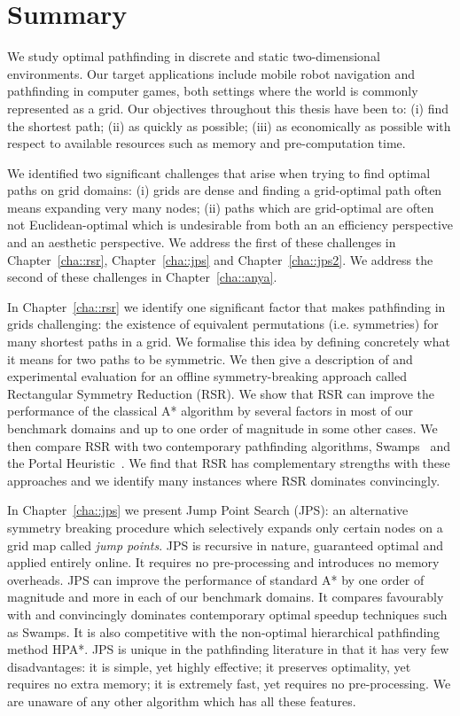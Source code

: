 \section{Summary}
\label{cha::conclusion::summary}
We study optimal pathfinding in discrete and static two-dimensional
environments. Our target applications include mobile robot navigation and
pathfinding in computer games, both settings where the world is commonly
represented as a grid. Our objectives throughout this thesis have been to: (i)
find the shortest path; (ii) as quickly as possible; (iii) as economically as
possible with respect to available resources such as memory and
pre-computation time.

We identified two significant challenges that arise when trying to find optimal
paths on grid domains: (i) grids are dense and finding a grid-optimal path often
means expanding very many nodes; (ii) paths which are grid-optimal are often
not Euclidean-optimal which is undesirable from both an an efficiency
perspective and an aesthetic perspective. We address the first of these
challenges in Chapter~\ref{cha::rsr}, Chapter~\ref{cha::jps} and
Chapter~\ref{cha::jps2}.  We address the second of these challenges in
Chapter~\ref{cha::anya}.

In Chapter~\ref{cha::rsr} we identify one significant factor that makes
pathfinding in grids challenging: the existence of equivalent permutations 
(i.e. symmetries) for many shortest paths in a grid. We formalise this idea by defining concretely
what it means for two paths to be symmetric. We then give a description of and
experimental evaluation for an offline symmetry-breaking approach called
Rectangular Symmetry Reduction (RSR). We show that RSR can improve the
performance of the classical A{*} algorithm by several factors in most of our
benchmark domains and up to one order of magnitude in some other cases.
We then compare RSR with two contemporary pathfinding algorithms, 
Swamps~\citep{pochter10} and the Portal Heuristic~\citep{goldenberg10}.
We find that RSR has complementary strengths with these approaches and we
identify many instances where RSR dominates convincingly.

In Chapter~\ref{cha::jps} we present Jump Point Search (JPS): an alternative
symmetry breaking procedure which selectively expands only certain nodes on
a grid map called \emph{jump points}.  JPS is recursive in nature,
guaranteed optimal and applied entirely online. It requires no pre-processing
and introduces no memory overheads. JPS can improve the performance of standard
A{*} by one order of magnitude and more in each of our benchmark domains. It
compares favourably with and convincingly dominates contemporary optimal
speedup techniques such as Swamps. It is also competitive with the non-optimal
hierarchical pathfinding method HPA{*}.  JPS is unique in the pathfinding
literature in that it has very few disadvantages: it is simple, yet highly
effective; it preserves optimality, yet requires no extra memory;  it is
extremely fast, yet requires no pre-processing. We are unaware of any 
other algorithm which has all these features.

